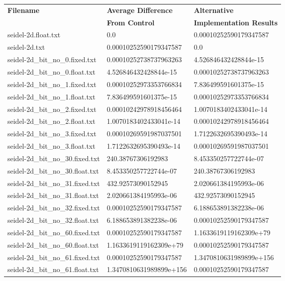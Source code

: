 \begin{table}
\begin{tabular}{lll}
{\bf Filename} & {\bf Average Difference} & {\bf Alternative } \\
       ~      & {\bf From Control }      & {\bf Implementation Results}\\
 \hline
    seidel-2d.float.txt & 0.0   & 0.00010252590179347587 \\
    seidel-2d.txt & 0.00010252590179347587 & 0.0 \\
    seidel-2d\_bit\_no\_0.fixed.txt & 0.00010252738737963263 & 4.526846432428844e-15  \\
    seidel-2d\_bit\_no\_0.float.txt &  4.526846432428844e-15 & 0.00010252738737963263 \\
    seidel-2d\_bit\_no\_1.fixed.txt & 0.00010252973353766834 & 7.836499591601375e-15 \\
    seidel-2d\_bit\_no\_1.float.txt & 7.836499591601375e-15 & 0.00010252973353766834 \\
    seidel-2d\_bit\_no\_2.fixed.txt & 0.00010242978918456464 & 1.0070183402433041e-14 \\
    seidel-2d\_bit\_no\_2.float.txt & 1.0070183402433041e-14 & 0.00010242978918456464 \\
    seidel-2d\_bit\_no\_3.fixed.txt & 0.00010269591987037501 & 1.7122632695390493e-14 \\
    seidel-2d\_bit\_no\_3.float.txt & 1.7122632695390493e-14 & 0.00010269591987037501 \\
    seidel-2d\_bit\_no\_30.fixed.txt & 240.38767306192983 & 8.453350257722744e-07 \\
    seidel-2d\_bit\_no\_30.float.txt & 8.453350257722744e-07 & 240.38767306192983 \\
    seidel-2d\_bit\_no\_31.fixed.txt & 432.92573090152945 & 2.020661384195993e-06 \\
    seidel-2d\_bit\_no\_31.float.txt & 2.020661384195993e-06 & 432.92573090152945 \\
    seidel-2d\_bit\_no\_32.fixed.txt & 0.00010252590179347587 & 6.188653891382238e-06 \\
    seidel-2d\_bit\_no\_32.float.txt & 6.188653891382238e-06 & 0.00010252590179347587 \\
    seidel-2d\_bit\_no\_60.fixed.txt & 0.00010252590179347587 & 1.1633619119162309e+79 \\
    seidel-2d\_bit\_no\_60.float.txt & 1.1633619119162309e+79 & 0.00010252590179347587 \\
    seidel-2d\_bit\_no\_61.fixed.txt & 0.00010252590179347587 & 1.3470810631989899e+156 \\
    seidel-2d\_bit\_no\_61.float.txt & 1.3470810631989899e+156 & 0.00010252590179347587 \\

\end{tabular}
\end{table}
